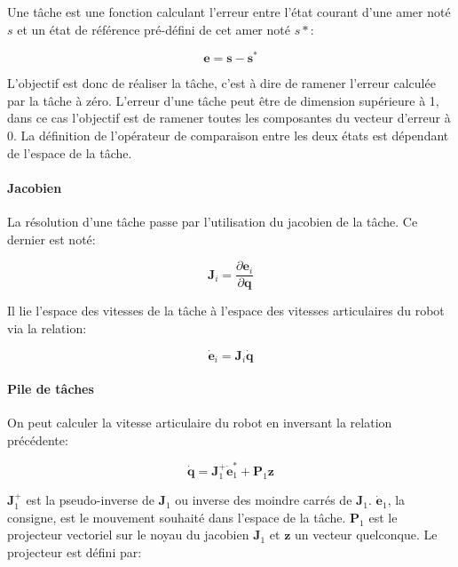\begin{mydef}
Une tâche est une fonction calculant l'erreur entre l'état courant
d'une amer noté $s$ et un état de référence pré-défini de cet amer
noté $s*$:

\begin{equation}
  \mathbf{e} = \mathbf{s} - \mathbf{s}^{*}
\end{equation}

L'objectif est donc de réaliser la tâche, c'est à dire de ramener
l'erreur calculée par la tâche à zéro. L'erreur d'une tâche peut être
de dimension supérieure à 1, dans ce cas l'objectif est de ramener
toutes les composantes du vecteur d'erreur à $0$. La définition de
l'opérateur de comparaison entre les deux états est dépendant de
l'espace de la tâche.
\end{mydef}

\paragraph{Jacobien}

La résolution d'une tâche passe par l'utilisation du jacobien de la
tâche. Ce dernier est noté:

\begin{equation}
  \mathbf{J}_i = \frac{\partial \mathbf{e}_i}{\partial \mathbf{q}}
\end{equation}

Il lie l'espace des vitesses de la tâche à l'espace des vitesses
articulaires du robot via la relation:

\begin{equation}
  \dot{\mathbf{e}}_i = \mathbf{J}_i \dot{\mathbf{q}}
\end{equation}


\paragraph{Pile de tâches}

On peut calculer la vitesse articulaire du robot en inversant la
relation précédente:

\begin{equation}
  \dot{\mathbf{q}} = \mathbf{J}_1^{+} \dot{\mathbf{e}}_1^{*} + \mathbf{P}_1 \mathbf{z}
\end{equation}

$\mathbf{J}_1^{+}$ est la pseudo-inverse de $\mathbf{J}_1$ ou inverse
des moindre carrés de $\mathbf{J}_1$. $\dot{\mathbf{e}}_1$, la
consigne, est le mouvement souhaité dans l'espace de la
tâche. $\mathbf{P}_1$ est le projecteur vectoriel sur le noyau du
jacobien $\mathbf{J}_1$ et $\mathbf{z}$ un vecteur quelconque. Le
projecteur est défini par:

